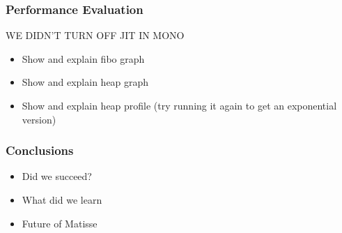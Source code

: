 \documentclass[handout]{beamer}
\begin{document}
\begin{frame}
  \frametitle{Performance Evaluation}

  WE DIDN'T TURN OFF JIT IN MONO

  \begin{itemize}
  \item Show and explain fibo graph
  \item Show and explain heap graph
  \item Show and explain heap profile (try running it again to get an exponential version)
  \end{itemize}
\end{frame}

\begin{frame}
  \frametitle{Conclusions}

  \begin{itemize}
  \item Did we succeed?
  \item What did we learn
  \item Future of Matisse
  \end{itemize}
\end{frame}
\end{document}
